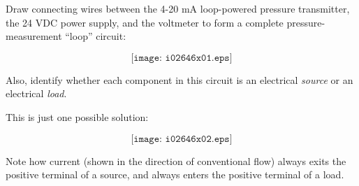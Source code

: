 

Draw connecting wires between the 4-20 mA loop-powered pressure transmitter, the 24 VDC power supply, and the voltmeter to form a complete pressure-measurement ``loop'' circuit:

$$\texttt{[image: i02646x01.eps]}$$

Also, identify whether each component in this circuit is an electrical {\it source} or an electrical {\it load}.







This is just one possible solution:

$$\texttt{[image: i02646x02.eps]}$$

Note how current (shown in the direction of conventional flow) always exits the positive terminal of a source, and always enters the positive terminal of a load.











